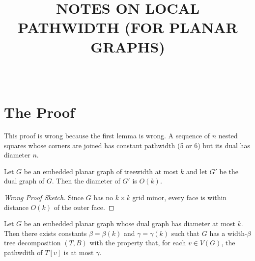 \documentclass{patmorin}
\title{\MakeUppercase{Notes on Local Pathwidth (for Planar Graphs)}}
\author{\ } %
\begin{document}
\maketitle

\section{The Proof}


This proof is wrong because the first lemma is wrong.  A sequence of $n$
nested squares whose corners are joined has constant pathwidth (5 or 6)
but its dual has diameter $n$.

\begin{lem}[False]
   Let $G$ be an embedded planar graph of treewidth at most $k$ and let
   $G'$ be the dual graph of $G$.  Then the diameter of $G'$ is $O(k)$.
\end{lem}

\begin{proof}[Wrong Proof Sketch]
   Since $G$ has no $k\times k$ grid minor, every face is within distance
   $O(k)$ of the outer face.
\end{proof}


\begin{lem}
  Let $G$ be an embedded planar graph whose dual graph has diameter at most
  $k$. Then there exists constants $\beta=\beta(k)$ and $\gamma=\gamma(k)$
  such that $G$ has a width-$\beta$ tree decomposition $(T,B)$ with
  the property that, for each $v\in V(G)$, the pathwdith of $T[v]$
  is at most $\gamma$.
\end{lem}
\end{document}

